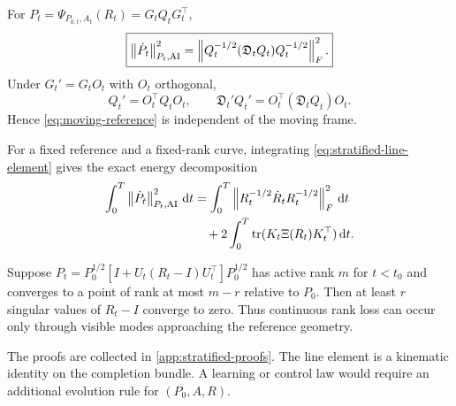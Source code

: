 \begin{proposition}
\label{prop:moving-reference}
\mbox{}\par\noindent
For \(P_t=\Psi_{P_{0,t},A_t}(R_t)=G_tQ_tG_t^\top\),
\begin{equation}
  \boxed{
  \left\lVert \dot P_t\right\rVert_{P_t,\mathrm{AI}}^2
  =\left\lVert Q_t^{-1/2}(\mathfrak D_tQ_t)Q_t^{-1/2}\right\rVert_F^2.}
  \label{eq:moving-reference}
\end{equation}
Under \(G_t'=G_tO_t\) with \(O_t\) orthogonal,
\[
  Q_t'=O_t^\top Q_tO_t,
  \qquad
  \mathfrak D_t'Q_t'=O_t^\top(\mathfrak D_tQ_t)O_t.
\]
Hence \eqref{eq:moving-reference} is independent of the moving frame.
\end{proposition}

For a fixed reference and a fixed-rank curve, integrating
\eqref{eq:stratified-line-element} gives the exact energy decomposition
\begin{align}
  \int_0^T\left\lVert \dot P_t\right\rVert_{P_t,\mathrm{AI}}^2\,\mathrm d t
  &=\int_0^T\left\lVert R_t^{-1/2}\dot R_tR_t^{-1/2}\right\rVert_F^2\,\mathrm d t
  \nonumber\\
  &\quad+2\int_0^T\operatorname{tr}(K_t\Xi(R_t)K_t^\top)\,\mathrm d t.
  \label{eq:integrated-energy}
\end{align}

\begin{corollary}
\label{cor:rank-loss}
Suppose
\(P_t=P_0^{1/2}[I+U_t(R_t-I)U_t^\top]P_0^{1/2}\) has active rank \(m\)
for \(t<t_0\) and converges to a point of rank at most \(m-r\) relative to
\(P_0\).  Then at least \(r\) singular values of \(R_t-I\) converge to zero.
Thus continuous rank loss can occur only through visible modes approaching the
reference geometry.
\end{corollary}

The proofs are collected in \cref{app:stratified-proofs}.  The line element is
a kinematic identity on the completion bundle.  A learning or control law
would require an additional evolution rule for \((P_0,A,R)\).
